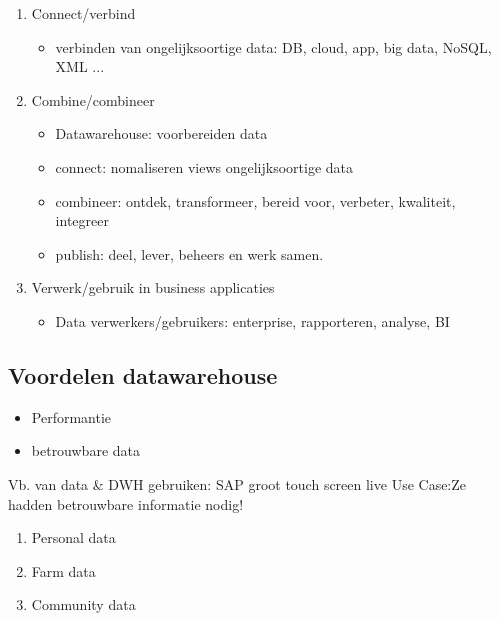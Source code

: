 \documentclass{report}
\begin{document}
\begin{enumerate}
    \item Connect/verbind
    \begin{itemize}
        \item verbinden van ongelijksoortige data: DB, cloud, app, big data, NoSQL, XML ...
    \end{itemize}
    \item Combine/combineer
    \begin{itemize}
        \item Datawarehouse: voorbereiden data
        \item connect: nomaliseren views ongelijksoortige data
        \item combineer: ontdek, transformeer, bereid voor, verbeter, kwaliteit, integreer
        \item publish: deel, lever, beheers en werk samen.
    \end{itemize}
    \item Verwerk/gebruik in business applicaties
    \begin{itemize}
        \item Data verwerkers/gebruikers: enterprise, rapporteren, analyse, BI
    \end{itemize}
\end{enumerate}
\subsection{Voordelen datawarehouse}
\begin{itemize}
    \item Performantie
    \item betrouwbare data
\end{itemize}
Vb. van data \& DWH gebruiken: SAP groot touch screen live
Use Case:Ze hadden betrouwbare informatie nodig!
\begin{enumerate}
    \item Personal data
    \item Farm data
    \item Community data
\end{enumerate}
\end{document}
